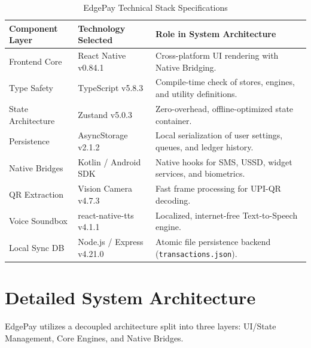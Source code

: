 \documentclass[10pt,journal,compsoc]{IEEEtran}
\begin{document}
\begin{table}[htbp]
\caption{EdgePay Technical Stack Specifications}
\label{tab:tech_stack}
\centering
\scriptsize
\begin{tabular}{lll}
\toprule
\textbf{Component Layer} & \textbf{Technology Selected} & \textbf{Role in System Architecture} \\
\midrule
Frontend Core & React Native v0.84.1 & Cross-platform UI rendering with Native Bridging. \\
Type Safety & TypeScript v5.8.3 & Compile-time check of stores, engines, and utility definitions. \\
State Architecture & Zustand v5.0.3 & Zero-overhead, offline-optimized state container. \\
Persistence & AsyncStorage v2.1.2 & Local serialization of user settings, queues, and ledger history. \\
Native Bridges & Kotlin / Android SDK & Native hooks for SMS, USSD, widget services, and biometrics. \\
QR Extraction & Vision Camera v4.7.3 & Fast frame processing for UPI-QR decoding. \\
Voice Soundbox & react-native-tts v4.1.1 & Localized, internet-free Text-to-Speech engine. \\
Local Sync DB & Node.js / Express v4.21.0 & Atomic file persistence backend (\texttt{transactions.json}). \\
\bottomrule
\end{tabular}
\end{table}

\section{Detailed System Architecture}
EdgePay utilizes a decoupled architecture split into three layers: UI/State Management, Core Engines, and Native Bridges.
\end{document}
